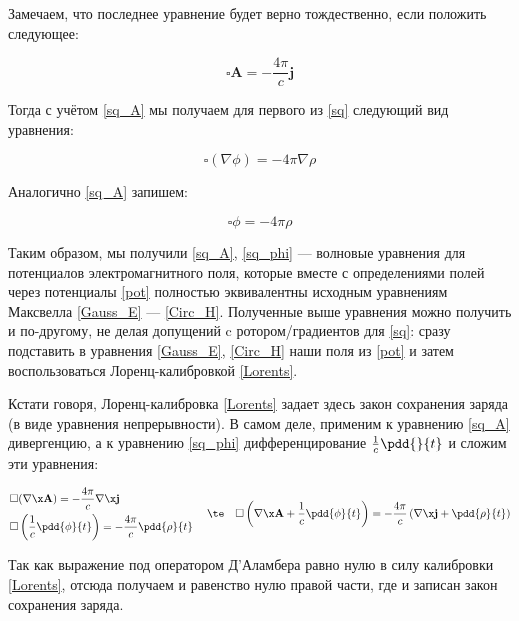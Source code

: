 \documentclass[12pt]{kiarticle}
\begin{document}
Замечаем, что последнее уравнение будет верно тождественно, если положить следующее: 

\begin{equation}\label{sq_A}
\square \mathbf{A} = - \dfrac{4\pi}{c}\mathbf{j}
\end{equation}

Тогда с учётом \eqref{sq_A} мы получаем для первого из \eqref{sq} следующий вид уравнения:

\begin{equation}\label{}
\square (\nabla \phi) = -4\pi \nabla \rho
\end{equation}

Аналогично \eqref{sq_A} запишем:

\begin{equation}\label{sq_phi}
\square \phi = - 4 \pi \rho
\end{equation}

Таким образом, мы получили \eqref{sq_A}, \eqref{sq_phi} --- волновые уравнения для потенциалов электромагнитного поля, которые вместе с определениями полей через потенциалы \eqref{pot} полностью эквивалентны исходным уравнениям Максвелла \eqref{Gauss_E} --- \eqref{Circ_H}. Полученные выше уравнения можно получить и по-другому, не делая допущений c ротором/градиентов для \eqref{sq}: сразу подставить в уравнения \eqref{Gauss_E}, \eqref{Circ_H} наши поля из \eqref{pot} и затем воспользоваться Лоренц-калибровкой \eqref{Lorents}.

Кстати говоря, Лоренц-калибровка \eqref{Lorents} задает здесь закон сохранения заряда (в виде уравнения непрерывности). В самом деле, применим к уравнению \eqref{sq_A} дивергенцию, а к уравнению \eqref{sq_phi} дифференцирование $ \frac{1}{c}\pdd{}{t} $ и сложим эти уравнения: 

\begin{equation}\label{}
\left.
\begin{aligned}
& \square (\nabla \x \mathbf{A}) = - \dfrac{4\pi}{c} \nabla \x \mathbf{j} \\
& \square \left(  \dfrac{1}{c}\pdd{\phi}{t} \right)  = - \dfrac{4\pi}{c} \pdd{\rho}{t}
\end{aligned}
\right.
\quad \te \quad
\square \left( \nabla \x \mathbf{A}+ \dfrac{1}{c} \pdd{\phi}{t} \right)  = - \dfrac{4 \pi}{c} \left(  \nabla \x \mathbf{j} + \pdd{\rho}{t} \right) 
\end{equation}

Так как выражение под оператором Д'Аламбера равно нулю в силу калибровки \eqref{Lorents}, отсюда получаем и равенство нулю правой части, где и записан закон сохранения заряда. 
\end{document}
